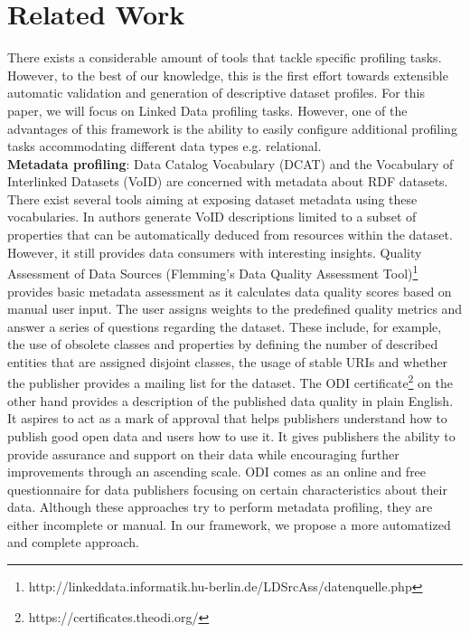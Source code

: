 \documentclass[runningheads,a4paper]{llncs}
\begin{document}

\section{Related Work}
\label{sec:related-work}
There exists a considerable amount of tools that tackle specific profiling tasks. However, to the best of our knowledge, this is the first effort towards extensible automatic validation and generation of descriptive dataset profiles. For this paper, we will focus on Linked Data profiling tasks. However, one of the advantages of this framework is the ability to easily configure additional profiling tasks accommodating different data types e.g. relational.\\

\textbf{Metadata profiling}: Data Catalog Vocabulary (DCAT) \cite{Erickson:14:DCV} and the Vocabulary of Interlinked Datasets (VoID) \cite{Cyganiak:11:DLD} are concerned with metadata about RDF datasets. There exist several tools aiming at exposing dataset metadata using these vocabularies. In \cite{BoHm:2011:CVD:2030805.2031001} authors generate VoID descriptions limited to a subset of properties that can be automatically deduced from resources within the dataset. However, it still provides data consumers with interesting insights. Quality Assessment of Data Sources (Flemming's Data Quality Assessment Tool)\footnote{http://linkeddata.informatik.hu-berlin.de/LDSrcAss/datenquelle.php} provides basic metadata assessment as it calculates data quality scores based on manual user input. The user assigns weights to the predefined quality metrics and answer a series of questions regarding the dataset. These include, for example, the use of obsolete classes and properties by defining the number of described entities that are assigned disjoint classes, the usage of stable URIs and whether the publisher provides a mailing list for the dataset. The ODI certificate\footnote {https://certificates.theodi.org/} on the other hand provides a description of the published data quality in plain English. It aspires to act as a mark of approval that helps publishers understand how to publish good open data and users how to use it. It gives publishers the ability to provide assurance and support on their data while encouraging further improvements through an ascending scale. ODI comes as an online and free questionnaire for data publishers focusing on certain characteristics about their data. Although these approaches try to perform metadata profiling, they are either incomplete or manual. In our framework, we propose a more automatized and complete approach.\\
\end{document}
